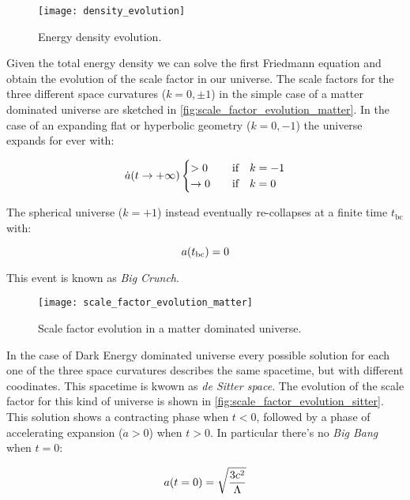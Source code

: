 \begin{figure}
        \centering
        \texttt{[image: density\_evolution]}
        \caption{Energy density evolution.}
        \label{fig:density_evolution}
\end{figure}

Given the total energy density we can solve the first Friedmann equation
and obtain the evolution of the scale factor in our universe. The scale
factors for the three different space curvatures ($k = 0,\pm 1$) in the
simple case of a matter dominated universe are sketched in
\autoref{fig:scale_factor_evolution_matter}. In the case of an expanding
flat or hyperbolic geometry ($k = 0,-1$) the universe expands for ever with:

\begin{equation}
        \dot a\qty(t \rightarrow +\infty)
                \begin{cases}
                        > 0 & \qif k = -1 \\
                        \rightarrow 0 & \qif k = 0
                \end{cases}
\end{equation}

The spherical universe ($k = +1$) instead eventually re-collapses at a finite
time $t_{\text{bc}}$ with:

\begin{equation}
        a\qty(t_{\text{bc}}) = 0
\end{equation}

This event is known as \emph{Big Crunch}.

\begin{figure}
        \centering
        \texttt{[image: scale\_factor\_evolution\_matter]}
        \caption{Scale factor evolution in a matter dominated universe.}
        \label{fig:scale_factor_evolution_matter}
\end{figure}

In the case of Dark Energy dominated universe every possible solution for
each one of the three space curvatures describes the same spacetime, but with
different coodinates. This spacetime is kwown as \emph{de Sitter space}.
The evolution of the scale factor for this kind of universe is shown in
\autoref{fig:scale_factor_evolution_sitter}. This solution shows a
contracting phase when $t < 0$, followed by a phase of accelerating
expansion ($\ddot a > 0$) when $t > 0$. In particular there's no
\emph{Big Bang} when $t = 0$:

\begin{equation}
        a\qty(t = 0) = \sqrt{\frac{3c^2}{\Lambda}}
\end{equation}

